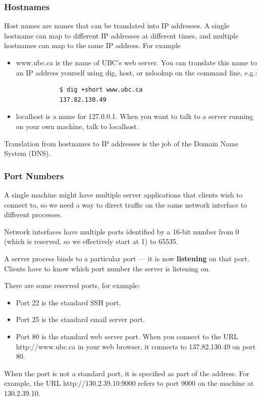 \documentclass[letterpaper,12pt]{article}
\begin{document}
\subsubsection{Hostnames}
Host names are names that can be translated into IP addresses. A single hostname can map to different IP addresses at different times, and multiple hostnames can map to the same IP address. For example\begin{itemize}
      \item www.ubc.ca is the name of UBC's web server. You can translate this name to an IP address yourself using dig, host, or nslookup on the command line, e.g.:\begin{lstlisting}
            $ dig +short www.ubc.ca
            137.82.130.49
      \end{lstlisting}
      \item localhost is a name for 127.0.0.1. When you want to talk to a server running on your own machine, talk to localhost.
\end{itemize}
Translation from hostnames to IP addresses is the job of the Domain Name System (DNS).
\subsubsection{Port Numbers}
A single machine might have multiple server applications that clients wish to connect to, so we need a way to direct traffic on the same network interface to different processes.

Network interfaces have multiple ports identified by a 16-bit number from 0 (which is reserved, so we effectively start at 1) to 65535.

A server process binds to a particular port — it is now \textbf{listening} on that port. Clients have to know which port number the server is listening on.

There are some reserved ports, for example:\begin{itemize}
      \item Port 22 is the standard SSH port.
      \item Port 25 is the standard email server port.
      \item Port 80 is the standard web server port. When you connect to the URL http://www.ubc.ca in your web browser, it connects to 137.82.130.49 on port 80.
\end{itemize}
When the port is not a standard port, it is specified as part of the address. For example, the URL http://130.2.39.10:9000 refers to port 9000 on the machine at 130.2.39.10.
\end{document}
